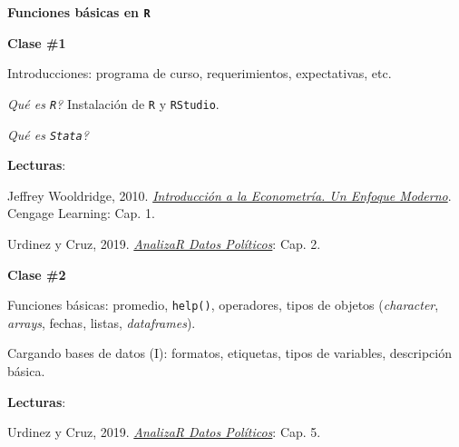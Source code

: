 \documentclass[letterpaper]{article}
\renewenvironment{itemize}{
  \begin{list}{}{
    \setlength{\leftmargin}{1.5em}
  }
}{
  \end{list}
}
\begin{document}
\begin{enumerate}
	\item {\bf Funciones b\'asicas en \texttt{R}}

			\begin{itemize} 
				\item[$\bullet$] {\bf Clase \#1}
				\begin{itemize} 
					\item[$\circ$] Introducciones: programa de curso, requerimientos, expectativas, etc.
					\item[$\circ$] \emph{Qu\'e es \texttt{R}?} Instalaci\'on de \texttt{R} y \texttt{RStudio}.
          \item[$\circ$] \emph{Qu\'e es \texttt{Stata}?}
					\item[$\circ$] {\bf Lecturas}: 
						\begin{itemize} 
							\item[$\diamond$] Jeffrey Wooldridge, 2010. \href{https://github.com/hbahamonde/Metodos_Cuanti_I/raw/master/Readings/Wooldridge.pdf}{\emph{Introducci\'on a la Econometr\'ia. Un Enfoque Moderno}}. Cengage Learning: Cap. 1.
							\item[$\diamond$] Urdinez y Cruz, 2019. \href{https://arcruz0.github.io/libroadp/index.html}{\emph{AnalizaR Datos Políticos}}: Cap. 2.
						\end{itemize}
				\end{itemize}
			\end{itemize}






			\begin{itemize} 
				\item[$\bullet$] {\bf Clase \#2}
				\begin{itemize} 
					\item[$\circ$] Funciones b\'asicas: promedio, \texttt{help()}, operadores, tipos de objetos (\emph{character}, \emph{arrays}, fechas, listas, \emph{dataframes}).
					\item[$\circ$] Cargando bases de datos (I): formatos, etiquetas, tipos de variables, descripci\'on b\'asica. %
					\item[$\circ$] {\bf Lecturas}: 
					\begin{itemize}
						\item[$\diamond$] Urdinez y Cruz, 2019. \href{https://arcruz0.github.io/libroadp/index.html}{\emph{AnalizaR Datos Políticos}}: Cap. 5.
					\end{itemize}
				\end{itemize}
			\end{itemize}



\end{enumerate}
\end{document}
